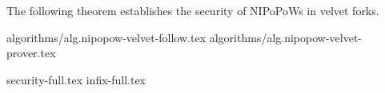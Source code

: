 The following theorem establishes the security of NIPoPoWs in velvet forks.


{algorithms/alg.nipopow-velvet-follow.tex}
{algorithms/alg.nipopow-velvet-prover.tex}

{security-full.tex}
{infix-full.tex}

%
